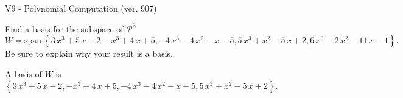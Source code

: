 \begin{exercise}
  \begin{exerciseTitle}V9 - Polynomial Computation (ver. 907)\end{exerciseTitle}
  \begin{exerciseStatement}
    Find a basis for the subspace of \(\mathcal{P}^3\) 
\[W=\mathrm{span}\ \left\{3 \, x^{3} + 5 \, x - 2 , -x^{3} + 4 \, x + 5 , -4 \, x^{3} - 4 \, x^{2} - x - 5 , 5 \, x^{3} + x^{2} - 5 \, x + 2 , 6 \, x^{3} - 2 \, x^{2} - 11 \, x - 1\right\}.\]
 Be sure to explain why your result is a basis.


  \end{exerciseStatement}
  \begin{exerciseAnswer}
   A basis of \(W\) is  \(\left\{3 \, x^{3} + 5 \, x - 2 , -x^{3} + 4 \, x + 5 , -4 \, x^{3} - 4 \, x^{2} - x - 5 , 5 \, x^{3} + x^{2} - 5 \, x + 2\right\}\).
  


  \end{exerciseAnswer}
\end{exercise}